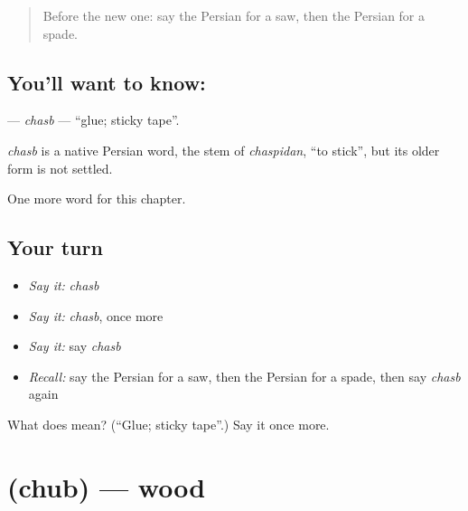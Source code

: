 \label{lesson:FA-C281-chasb}



\begin{quote}
Before the new one: say the Persian for a saw, then the Persian for a spade.
\end{quote}

\subsection*{You'll want to know: }
\textbf{} — \emph{chasb} — \textquotedblleft{}glue; sticky tape\textquotedblright{}.

\begin{cousinweb}
\emph{chasb} is a native Persian word, the stem of \emph{chaspidan}, \textquotedblleft{}to stick\textquotedblright{}, but its older form is not settled.
\end{cousinweb}

\begin{grammarlens}[title={What you've built}]
One more word for this chapter.
\end{grammarlens}

\subsection*{Your turn}
\begin{itemize}
\raggedright
  \item \emph{Say it:} \emph{chasb}
  \item \emph{Say it:} \emph{chasb}, once more
  \item \emph{Say it:} say \emph{chasb}
  \item \emph{Recall:} say the Persian for a saw, then the Persian for a spade, then say \emph{chasb} again
\end{itemize}

\begin{tcolorbox}[breakable,colback=teal!4,colframe=teal!35!black,title={Before you move on}]
What does  mean? (\textquotedblleft{}Glue; sticky tape\textquotedblright{}.) Say it once more.
\end{tcolorbox}
\section[\texorpdfstring{\fa{چوب} (chub)}{چوب (chub)}]{ (chub) — wood}

\label{lesson:FA-C281-chub}



